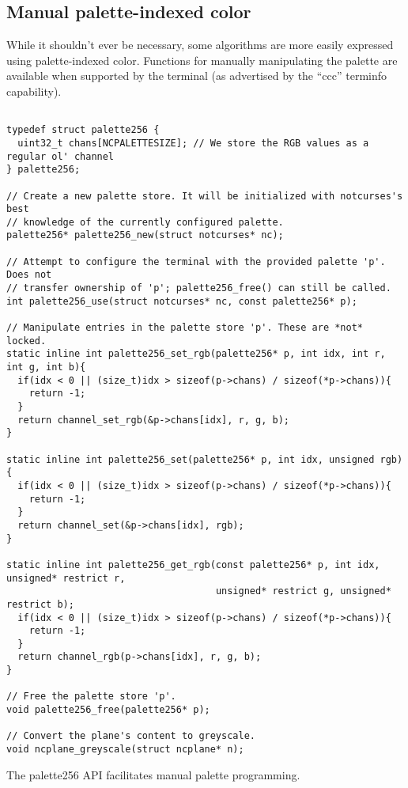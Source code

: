 \subsection{Manual palette-indexed color}
\label{sec:palettes}
While it shouldn't ever be necessary, some algorithms are more easily expressed
using palette-indexed color. Functions for manually manipulating the palette
are available when supported by the terminal (as advertised by the ``ccc''
terminfo capability).
\begin{listing}[!htbp]
\begin{verbatim}

typedef struct palette256 {
  uint32_t chans[NCPALETTESIZE]; // We store the RGB values as a regular ol' channel
} palette256;

// Create a new palette store. It will be initialized with notcurses's best
// knowledge of the currently configured palette.
palette256* palette256_new(struct notcurses* nc);

// Attempt to configure the terminal with the provided palette 'p'. Does not
// transfer ownership of 'p'; palette256_free() can still be called.
int palette256_use(struct notcurses* nc, const palette256* p);

// Manipulate entries in the palette store 'p'. These are *not* locked.
static inline int palette256_set_rgb(palette256* p, int idx, int r, int g, int b){
  if(idx < 0 || (size_t)idx > sizeof(p->chans) / sizeof(*p->chans)){
    return -1;
  }
  return channel_set_rgb(&p->chans[idx], r, g, b);
}

static inline int palette256_set(palette256* p, int idx, unsigned rgb){
  if(idx < 0 || (size_t)idx > sizeof(p->chans) / sizeof(*p->chans)){
    return -1;
  }
  return channel_set(&p->chans[idx], rgb);
}

static inline int palette256_get_rgb(const palette256* p, int idx, unsigned* restrict r,
                                     unsigned* restrict g, unsigned* restrict b);
  if(idx < 0 || (size_t)idx > sizeof(p->chans) / sizeof(*p->chans)){
    return -1;
  }
  return channel_rgb(p->chans[idx], r, g, b);
}

// Free the palette store 'p'.
void palette256_free(palette256* p);

// Convert the plane's content to greyscale.
void ncplane_greyscale(struct ncplane* n);
\end{verbatim}
\caption{The palette256 API facilitates manual palette programming.}
\label{list:palette256}
\end{listing}
